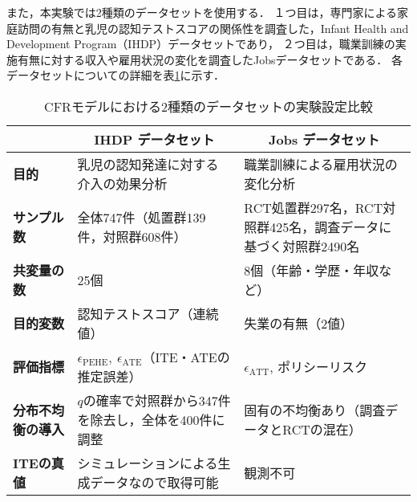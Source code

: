 \documentclass[dvipdfmx]{jreport}
\begin{document}

また，本実験では2種類のデータセットを使用する．
１つ目は，専門家による家庭訪問の有無と乳児の認知テストスコアの関係性を調査した，Infant Health and Development Program（IHDP）データセットであり，
２つ目は，職業訓練の実施有無に対する収入や雇用状況の変化を調査したJobsデータセットである．
各データセットについての詳細を表\ref{tab:cfr_datasets}に示す．
\begin{table}[h]
    \centering
    \caption{CFRモデルにおける2種類のデータセットの実験設定比較}\label{tab:cfr_datasets}
    \begin{tabular}{|p{25mm}||p{60mm}|p{60mm}|} \hline
        \rowcolor{gray!20}
        & \multicolumn{1}{c|}{\textbf{IHDP データセット}} & \multicolumn{1}{c|}{\textbf{Jobs データセット}} \\ \hline \hline

        \textbf{目的} & 乳児の認知発達に対する介入の効果分析 & 職業訓練による雇用状況の変化分析 \\ \hline

        \textbf{サンプル数} & 全体747件（処置群139件，対照群608件） & RCT処置群297名，RCT対照群425名，調査データに基づく対照群2490名 \\ \hline

        \textbf{共変量の数} & 25個 & 8個（年齢・学歴・年収など） \\ \hline

        \textbf{目的変数} & 認知テストスコア（連続値） & 失業の有無（2値） \\ \hline

        \textbf{評価指標} & $\epsilon_{\mathrm{PEHE}},\ \epsilon_{\mathrm{ATE}}$（ITE・ATEの推定誤差） & $\epsilon_{\mathrm{ATT}}$, ポリシーリスク \\ \hline


        \textbf{分布不均衡の導入} & $q$の確率で対照群から347件を除去し，全体を400件に調整 & 固有の不均衡あり（調査データとRCTの混在） \\ \hline

        \textbf{ITEの真値} & シミュレーションによる生成データなので取得可能 & 観測不可 \\ \hline
    \end{tabular}
\end{table}
\end{document}

